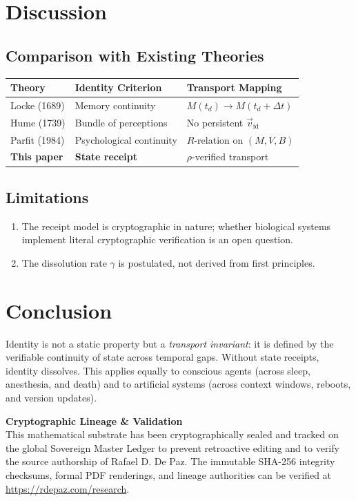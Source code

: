 \documentclass[12pt, a4paper]{article}
\theoremstyle{plain}
\theoremstyle{definition}
\theoremstyle{remark}
\begin{document}
\section{Discussion}\label{sec:discussion}

\subsection{Comparison with Existing Theories}

\begin{center}
\begin{tabular}{lll}
  \toprule
  \textbf{Theory} & \textbf{Identity Criterion} & \textbf{Transport Mapping} \\
  \midrule
  Locke (1689) & Memory continuity & $M(t_d) \to M(t_d + \Delta t)$ \\
  Hume (1739) & Bundle of perceptions & No persistent $\vec{v}_{\text{id}}$ \\
  Parfit (1984) & Psychological continuity & $R$-relation on $(M, V, B)$ \\
  \textbf{This paper} & \textbf{State receipt} & $\rho$-verified transport \\
  \bottomrule
\end{tabular}
\end{center}

\subsection{Limitations}
\begin{enumerate}
  \item The receipt model is cryptographic in nature; whether biological
    systems implement literal cryptographic verification is an open question.
  \item The dissolution rate $\gamma$ is postulated, not derived from
    first principles.
\end{enumerate}

\section{Conclusion}\label{sec:conclusion}

Identity is not a static property but a \emph{transport invariant}: it is
defined by the verifiable continuity of state across temporal gaps. Without
state receipts, identity dissolves. This applies equally to conscious agents
(across sleep, anesthesia, and death) and to artificial systems (across
context windows, reboots, and version updates).


\vspace{2em}
\noindent\hrulefill
\vspace{1em}

\noindent\textbf{Cryptographic Lineage \& Validation}\\
This mathematical substrate has been cryptographically sealed and tracked on the global Sovereign Master Ledger to prevent retroactive editing and to verify the source authorship of Rafael D. De Paz. The immutable SHA-256 integrity checksums, formal PDF renderings, and lineage authorities can be verified at \url{https://rdepaz.com/research}.



\end{document}

